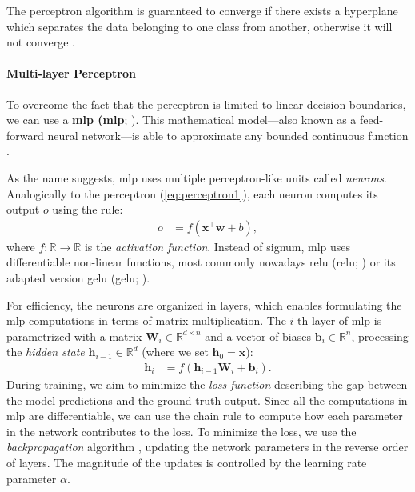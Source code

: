 The perceptron algorithm is guaranteed to converge if there exists a hyperplane which separates the data belonging to one class from another, otherwise it will not converge \cite{novikoff1962convergence}.

\paragraph{Multi-layer Perceptron} To overcome the fact that the perceptron is limited to linear decision boundaries, we can use a \textbf{\acl{mlp} (\acs{mlp}}; \citealp[p.~227]{bishop2006pattern}). This mathematical model---also known as a feed-forward neural network---is able to approximate any bounded continuous function \cite{hornik1989multilayer}.

As the name suggests, \ac{mlp} uses multiple perceptron-like units called \textit{neurons}. Analogically to the perceptron (\autoref{eq:perceptron1}), each neuron computes its output $o$ using the rule:
\begin{align}
    o & = f(\mathbf{x}^\top \mathbf{w}  + b),
\end{align}
where $f: \mathbb{R} \rightarrow \mathbb{R}$ is the \emph{activation function}. Instead of signum, \ac{mlp} uses differentiable non-linear functions, most commonly nowadays \acl{relu} (\acs{relu}; \citealp{nair2010rectified}) or its adapted version \acl{gelu} (\acs{gelu}; \citealp{hendrycks2016gaussian}).

For efficiency, the neurons are organized in layers, which enables formulating the \ac{mlp} computations in terms of matrix multiplication. The $i$-th layer of \ac{mlp} is parametrized with a matrix $\mathbf{W}_i \in \mathbb{R}^{d\times n}$ and a vector of biases $\mathbf{b}_i \in \mathbb{R}^{n}$, processing the \textit{hidden state} $\mathbf{h}_{i-1} \in \mathbb{R}^{d}$ (where we set $\textbf{h}_0 = \textbf{x}$):
\begin{align}
    \mathbf{h}_i & = f(\mathbf{h}_{i-1} \mathbf{W}_i + \mathbf{b}_i).
\end{align}
During training, we aim to minimize the \textit{loss function} describing the gap between the model predictions and the ground truth output. Since all the computations in \ac{mlp} are differentiable, we can use the chain rule to compute how each parameter in the network contributes to the loss. To minimize the loss, we use the \emph{backpropagation} algorithm \cite{kelley1960gradient,rumelhart1986learning}, updating the network parameters in the reverse order of layers. The magnitude of the updates is controlled by the learning rate parameter $\alpha$.

